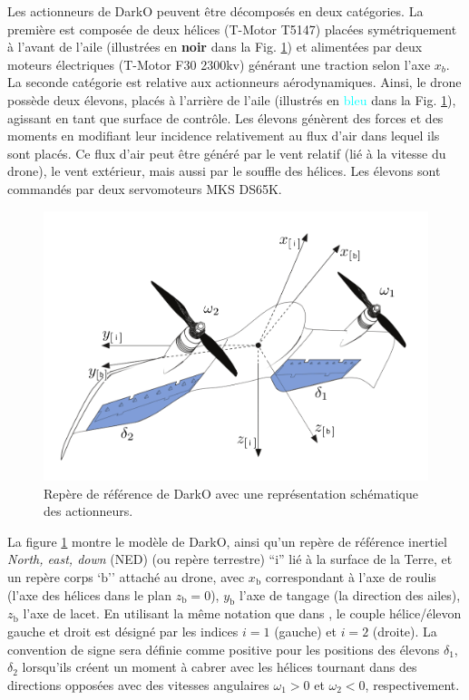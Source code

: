 


Les actionneurs de DarkO peuvent être décomposés en deux catégories. La première est composée de deux hélices (T-Motor T5147) placées symétriquement à l'avant de l'aile (illustrées en \textbf{noir} dans la Fig. \ref{fig:darko2}) et alimentées par deux moteurs électriques (T-Motor F30 2300kv) générant une traction selon l'axe $x_{b}$. La seconde catégorie est relative aux actionneurs aérodynamiques. Ainsi, le drone possède deux élevons, placés à l'arrière de l'aile (illustrés en \textcolor{cyan}{bleu} dans la Fig. \ref{fig:darko2}), agissant en tant que surface de contrôle. Les élevons génèrent des forces et des moments en modifiant leur incidence relativement au flux d'air dans lequel ils sont placés. Ce flux d'air peut être généré par le vent relatif (lié à la vitesse du drone), le vent extérieur, mais aussi par le souffle des hélices. Les élevons sont commandés par deux servomoteurs MKS DS65K.

\begin{figure}[ht!]
    \centering
    \includegraphics[width=0.8\columnwidth]{figures/darko.png}
    \caption{Repère de référence de DarkO avec une représentation schématique des actionneurs.}
    \label{fig:darko2}
\end{figure}

La figure \ref{fig:darko2} montre le modèle de DarkO, ainsi qu'un repère de référence inertiel \textit{North, east, down} (NED)  (ou repère terrestre) ``$\text{i}$'' lié à la surface de la Terre, et un repère corps `$\text{b}$'' attaché au drone, avec $x_{\text{b}}$ correspondant à l'axe de roulis (l'axe des hélices dans le plan $z_{ \text{b} } = 0$), $y_{\text{b}}$ l'axe de tangage (la direction des ailes), $z_{\text{b}}$ l'axe de lacet. En utilisant la même notation que dans \cite{lustosaHal-03035938}, le couple hélice/élevon gauche et droit est désigné par les indices $i=1$ (gauche) et $i=2$ (droite). La convention de signe sera définie comme positive pour les positions des élevons $\delta_{1}$, $\delta_{2}$ lorsqu'ils créent un moment à cabrer avec les hélices tournant dans des directions opposées avec des vitesses angulaires $\omega_{1} > 0$ et $\omega_{2} < 0$, respectivement.

